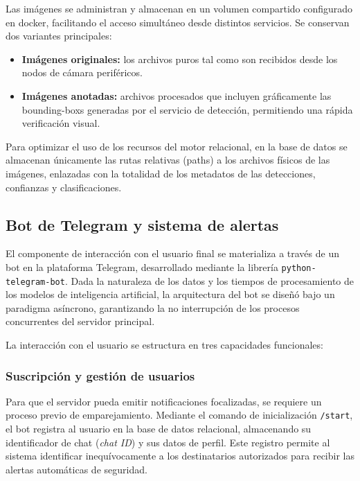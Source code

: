 \documentclass[a4paper, 12pt]{report}
\begin{document}
Las imágenes se administran y almacenan en un volumen compartido configurado en \gls{docker}, facilitando el acceso simultáneo desde distintos servicios. Se conservan dos variantes principales:

\begin{itemize}
  \item \textbf{Imágenes originales:} los archivos puros tal como son recibidos desde los nodos de cámara periféricos.
  \item \textbf{Imágenes anotadas:} archivos procesados que incluyen gráficamente las \glspl{bounding-box} generadas por el servicio de detección, permitiendo una rápida verificación visual.
\end{itemize}

Para optimizar el uso de los recursos del motor relacional, en la base de datos se almacenan únicamente las rutas relativas (paths) a los archivos físicos de las imágenes, enlazadas con la totalidad de los metadatos de las detecciones, confianzas y clasificaciones.

\subsection{Bot de Telegram y sistema de alertas}

El componente de interacción con el usuario final se materializa a través de un bot en la plataforma Telegram, desarrollado mediante la librería \texttt{python-telegram-bot}. Dada la naturaleza de los datos y los tiempos de procesamiento de los modelos de inteligencia artificial, la arquitectura del bot se diseñó bajo un paradigma asíncrono, garantizando la no interrupción de los procesos concurrentes del servidor principal.

La interacción con el usuario se estructura en tres capacidades funcionales:

\subsubsection{Suscripción y gestión de usuarios}

Para que el servidor pueda emitir notificaciones focalizadas, se requiere un proceso previo de emparejamiento. Mediante el comando de inicialización \texttt{/start}, el bot registra al usuario en la base de datos relacional, almacenando su identificador de chat (\textit{chat ID}) y sus datos de perfil. Este registro permite al sistema identificar inequívocamente a los destinatarios autorizados para recibir las alertas automáticas de seguridad.
\end{document}
